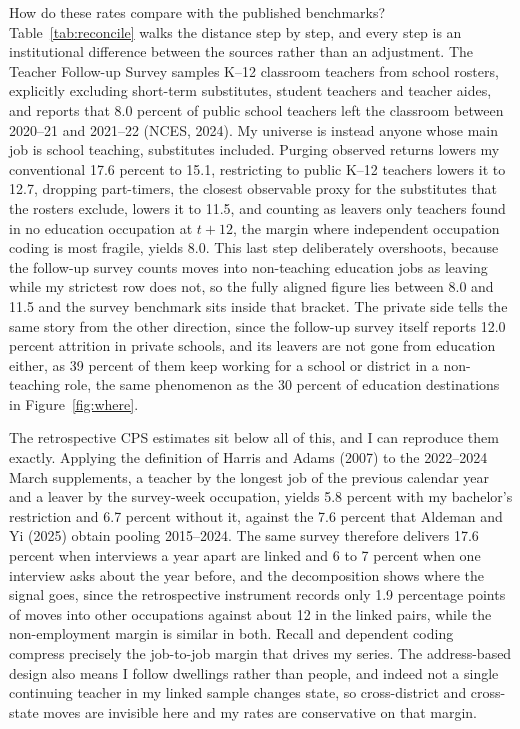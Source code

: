\documentclass[11pt,a4paper]{article}
\begin{document}
How do these rates compare with the published benchmarks?
Table~\ref{tab:reconcile} walks the distance step by step, and every step
is an institutional difference between the sources rather than an
adjustment. The Teacher Follow-up Survey samples K--12 classroom teachers
from school rosters, explicitly excluding short-term substitutes, student
teachers and teacher aides, and reports that 8.0 percent of public school
teachers left the classroom between 2020--21 and 2021--22 (NCES, 2024).
My universe is instead anyone whose main job is school teaching,
substitutes included. Purging observed returns lowers my conventional
17.6 percent to 15.1, restricting to public K--12 teachers lowers it to
12.7, dropping part-timers, the closest observable proxy for the
substitutes that the rosters exclude, lowers it to 11.5, and counting as
leavers only teachers found in no education occupation at $t{+}12$, the
margin where independent occupation coding is most fragile, yields 8.0.
This last step deliberately overshoots, because the follow-up survey
counts moves into non-teaching education jobs as leaving while my
strictest row does not, so the fully aligned figure lies between 8.0 and
11.5 and the survey benchmark sits inside that bracket. The private side
tells the same story from the other direction, since the follow-up survey
itself reports 12.0 percent attrition in private schools, and its leavers
are not gone from education either, as 39 percent of them keep working
for a school or district in a non-teaching role, the same phenomenon as
the 30 percent of education destinations in Figure~\ref{fig:where}.

The retrospective CPS estimates sit below all of this, and I can
reproduce them exactly. Applying the definition of Harris and Adams
(2007) to the 2022--2024 March supplements, a teacher by the longest job
of the previous calendar year and a leaver by the survey-week occupation,
yields 5.8 percent with my bachelor's restriction and 6.7 percent without
it, against the 7.6 percent that Aldeman and Yi (2025) obtain pooling
2015--2024. The same survey therefore delivers 17.6 percent when
interviews a year apart are linked and 6 to 7 percent when one interview
asks about the year before, and the decomposition shows where the signal
goes, since the retrospective instrument records only 1.9 percentage
points of moves into other occupations against about 12 in the linked
pairs, while the non-employment margin is similar in both. Recall and
dependent coding compress precisely the job-to-job margin that drives my
series. The address-based design also means I follow dwellings rather
than people, and indeed not a single continuing teacher in my linked
sample changes state, so cross-district and cross-state moves are
invisible here and my rates are conservative on that margin.
\end{document}
